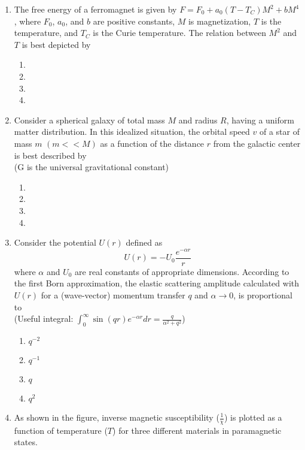 \documentclass[journal]{IEEEtran}
\begin{document}
\begin{enumerate}
\item The free energy of a ferromagnet is given by $F=F_0+a_0(T-T_C)M^2+bM^4$, where $F_0$, $a_0$, and $b$ are positive constants, $M$ is magnetization, $T$ is the temperature, and $T_C$ is the Curie temperature. The relation between $M^2$ and $T$ is best depicted by

\begin{enumerate}
\item 
\item 
\item 
\item 
\end{enumerate}

\item Consider a spherical galaxy of total mass $M$ and radius $R$, having a uniform matter distribution. In this idealized situation, the orbital speed $v$ of a star of mass $m$ $(m<<M)$ as a function of the distance $r$ from the galactic center is best described by \\ (G is the universal gravitational constant)

\begin{enumerate}
\item 
\item 
\item 
\item 
\end{enumerate}

\item Consider the potential $U(r)$ defined as $$U(r)=-U_0\frac{e^{-\alpha r}}{r}$$ where $\alpha$ and $U_0$ are real constants of appropriate dimensions. According to the first Born approximation, the elastic scattering amplitude calculated with $U(r)$ for a (wave-vector) momentum transfer $q$ and $\alpha\rightarrow0$, is proportional to \\ (Useful integral: $\int_0^\infty \sin{(qr)}e^{-\alpha r} dr=\frac{q}{\alpha^2+q^2}$)

\begin{enumerate}
\item $q^{-2}$
\item $q^{-1}$
\item $q$
\item $q^2$
\end{enumerate}

\item As shown in the figure, inverse magnetic susceptibility ($\frac{1}{\chi}$) is plotted as a function of temperature ($T$) for three different materials in paramagnetic states.


\end{enumerate}
\end{document}
